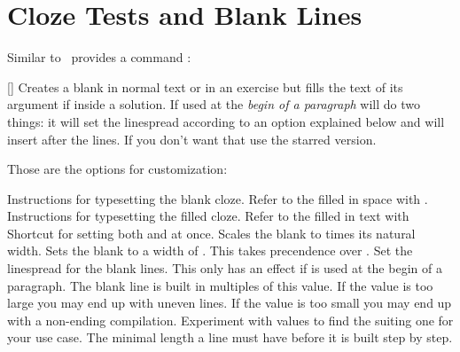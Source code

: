 \documentclass{xsim-manual}
\begin{document}
\section{Cloze Tests and Blank Lines}

Similar to  \xsim\ provides a command :
\begin{commands}
  [\sarg{}]
    Creates a blank in normal text or in an exercise but fills the text of its
    argument if inside a solution.  If used at the \emph{begin of a paragraph}
     will do two things: it will set the linespread according to an
    option explained below and will insert  after the lines.  If you
    don't want that use the starred version.
\end{commands}

Those are the options for customization:
\begin{options}
    Instructions for typesetting the blank cloze.  Refer to the filled in
    space with .
    Instructions for typesetting the filled cloze.  Refer to the filled in text
    with 
    Shortcut for setting both  and 
    at once.
\textsc{}    Scales the blank to  times its natural width.
  \Default
    Sets the blank to a width of .  This takes precendence over
    .
    Set the linespread for the blank lines. This only has an effect if
     is used at the begin of a paragraph.
  \Default{\code{1pt}}
    The blank line is built in multiples of this value.  If the value is too
    large you may end up with uneven lines.  If the value is too small you may
    end up with a non-ending compilation.  Experiment with values to find the
    suiting one for your use case.
  \Default{\code{2em}}
     The minimal length a line must have before it is built step by step.
\end{options}
\end{document}
